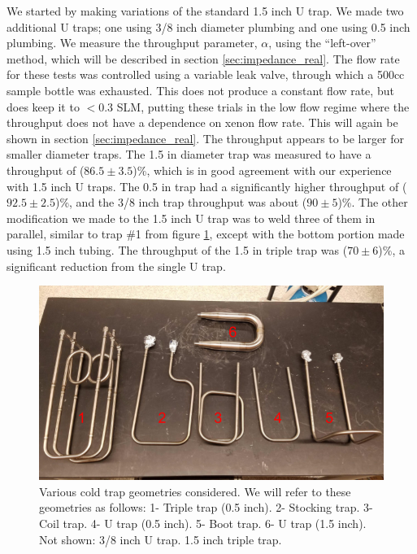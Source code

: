 We started by making variations of the standard 1.5 inch U trap. We made two additional U traps; one using 3/8 inch diameter plumbing and one using 0.5 inch plumbing. We measure the throughput parameter, $\alpha$, using the ``left-over'' method, which will be described in section \ref{sec:impedance_real}. The flow rate for these tests was controlled using a variable leak valve, through which a 500cc sample bottle was exhausted. This does not produce a constant flow rate, but does keep it to $<0.3$ SLM, putting these trials in the low flow regime where the throughput does not have a dependence on xenon flow rate. This will again be shown in section \ref{sec:impedance_real}. The throughput appears to be larger for smaller diameter traps. The 1.5 in diameter trap was measured to have a throughput of ($86.5\pm3.5$)\%, which is in good agreement with our experience with 1.5 inch U traps. The 0.5 in trap had a significantly higher throughput of ($92.5\pm 2.5$)\%, and the 3/8 inch trap throughput was about ($90\pm 5$)\%. The other modification we made to the 1.5 inch U trap was to weld three of them in parallel, similar to trap \#1 from figure \ref{fig:geometries}, except with the bottom portion made using 1.5 inch tubing. The throughput of the 1.5 in triple trap was ($70\pm6$)\%, a significant reduction from the single U trap.
\begin{figure}[h!]
\centering
\includegraphics[width=\textwidth]{Figures/cold_trap_geometries.png}
\caption{Various cold trap geometries considered. We will refer to these geometries as follows: 1- Triple trap (0.5 inch). 2- Stocking trap. 3- Coil trap. 4- U trap (0.5 inch). 5- Boot trap. 6- U trap (1.5 inch). Not shown: 3/8 inch U trap. 1.5 inch triple trap. }
\label{fig:geometries}
\end{figure}


